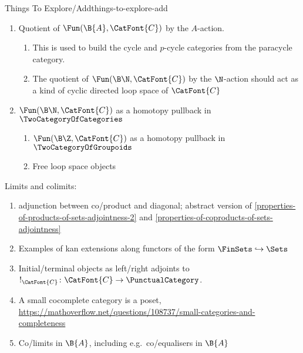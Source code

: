 \begin{remark}{Things To Explore/Add}{things-to-explore-add}
\begin{enumerate}
\begin{enumerate}
                \item Quotients of categories by actions of monoids $\B{A}$
                \item Quotients of categories by actions of monoids $A_{\disc}$
                \item Lax, oplax, pseudo, strict, etc.\ quotients of categories
                \item lax Kan extensions along $\B{\CatFont{C}}\to\B{\CatFont{D}}$ for $\CatFont{C}\to\CatFont{D}$ a monoidal functor
            \end{enumerate}
        \item Quotient of $\Fun(\B{A},\CatFont{C})$ by the $A$-action.
            \begin{enumerate}
                \item This is used to build the cycle and $p$-cycle categories from the paracycle category.
                \item The quotient of $\Fun(\B\N,\CatFont{C})$ by the $\N$-action should act as a kind of cyclic directed loop space of $\CatFont{C}$
            \end{enumerate}
        \item $\Fun(\B\N,\CatFont{C})$ as a homotopy pullback in $\TwoCategoryOfCategories$
            \begin{enumerate}
                \item $\Fun(\B\Z,\CatFont{C})$ as a homotopy pullback in $\TwoCategoryOfGroupoids$
                \item Free loop space objects
            \end{enumerate}
    \end{enumerate}
    Limits and colimits:
    \begin{enumerate}
        \item adjunction between co/product and diagonal; abstract version of \cref{properties-of-products-of-sets-adjointness-2} and \cref{properties-of-coproducts-of-sets-adjointness}
        \item Examples of kan extensions along functors of the form $\FinSets\hookrightarrow\Sets$
        \item Initial/terminal objects as left/right adjoints to $!_{\CatFont{C}}\colon\CatFont{C}\to\PunctualCategory$.
        \item A small cocomplete category is a poset, \url{https://mathoverflow.net/questions/108737/small-categories-and-completeness}
        \item Co/limits in $\B{A}$, including e.g.\ co/equalisers in $\B{A}$

\end{enumerate}
\end{remark}
